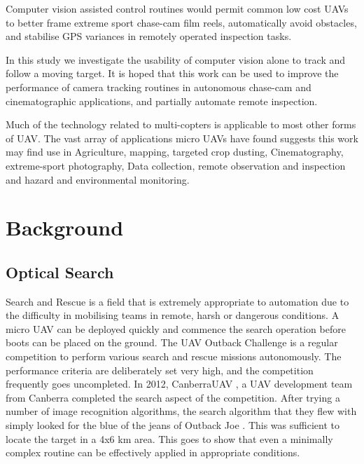 \documentclass{article}
\begin{document}
    Computer vision assisted control routines would permit common low cost UAVs to better frame extreme sport chase-cam film reels, automatically avoid obstacles, and stabilise GPS variances in remotely operated inspection tasks.

    In this study we investigate the usability of computer vision alone to track and follow a moving target.  It is hoped that this work can be used to improve the performance of camera tracking routines in autonomous chase-cam and cinematographic applications, and partially automate remote inspection.

    Much of the technology related to multi-copters is applicable to most other forms of UAV.  The vast array of applications micro UAVs have found suggests this work may find use in Agriculture, mapping, targeted crop dusting, Cinematography, extreme-sport photography, Data collection, remote observation and inspection and hazard and environmental monitoring.
  \section{Background}

    \subsection{Optical Search}
      Search and Rescue is a field that is extremely appropriate to automation due to the difficulty in mobilising teams in remote, harsh or dangerous conditions.  A micro UAV can be deployed quickly and commence the search operation before boots can be placed on the ground.
      The UAV Outback Challenge \cite{OutbackChallenge} is a regular competition to perform various search and rescue missions autonomously.  The performance criteria are deliberately set very high, and the competition frequently goes uncompleted.  
      In 2012, CanberraUAV \cite{canberrauav}, a UAV development team from Canberra completed the search aspect of the competition.
      After trying a number of image recognition algorithms, the search algorithm that they flew with simply looked for the blue of the jeans of Outback Joe \cite{tridge}. This was sufficient to locate the target in a 4x6 km area.  This goes to show that even a minimally complex routine can be effectively applied in appropriate conditions.
\end{document}
